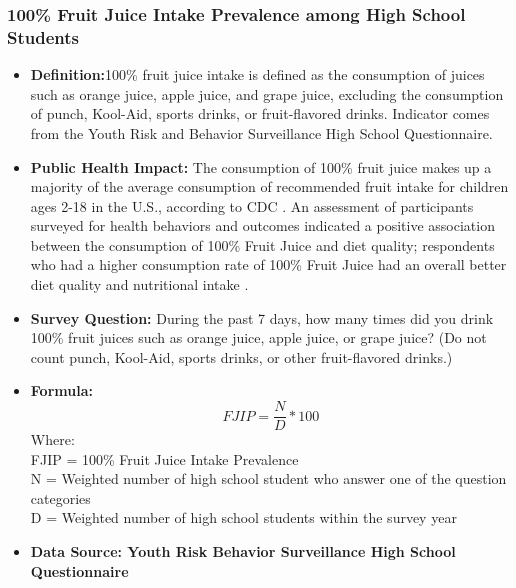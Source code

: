 \documentclass[12pt,letterpaper]{report}
\begin{document}
		\subsubsection{100\% Fruit Juice Intake Prevalence among High School Students} 
	\begin{itemize}
		\item \textbf{Definition:}100\% fruit juice intake is defined as the consumption of juices such as orange juice, apple juice, and grape juice, excluding the consumption of punch, Kool-Aid, sports drinks, or fruit-flavored drinks.  Indicator comes from the Youth Risk and Behavior Surveillance High School Questionnaire.
		\item \textbf{Public Health Impact:} The consumption of 100\% fruit juice makes up a majority of the average consumption of recommended fruit intake for children ages 2-18 in the U.S., according to CDC \cite{centersstrategies}. An assessment of participants surveyed for health behaviors and outcomes indicated a positive association between the consumption of 100\% Fruit Juice and diet quality; respondents who had a higher consumption rate of 100\% Fruit Juice had an overall better diet quality and nutritional intake \cite{o2011diet}.
		\item \textbf{Survey Question:} During the past 7 days, how many times did you drink 100\% fruit juices such as orange juice, apple juice, or grape juice? (Do not count punch, Kool-Aid, sports drinks, or other fruit-flavored drinks.)
		\item \textbf{Formula:} 
			\begin{equation}
				FJIP = \frac{N}{D} *100
			\end{equation}
Where: \\
			FJIP = 100\% Fruit Juice Intake Prevalence\\
			
			N = Weighted number of high school student who answer one of the question categories\\
			
			D = Weighted number of high school students within the survey year \\
			
		\item \textbf{Data Source: Youth Risk Behavior Surveillance High School Questionnaire}
	\end{itemize}
	
\end{document}

